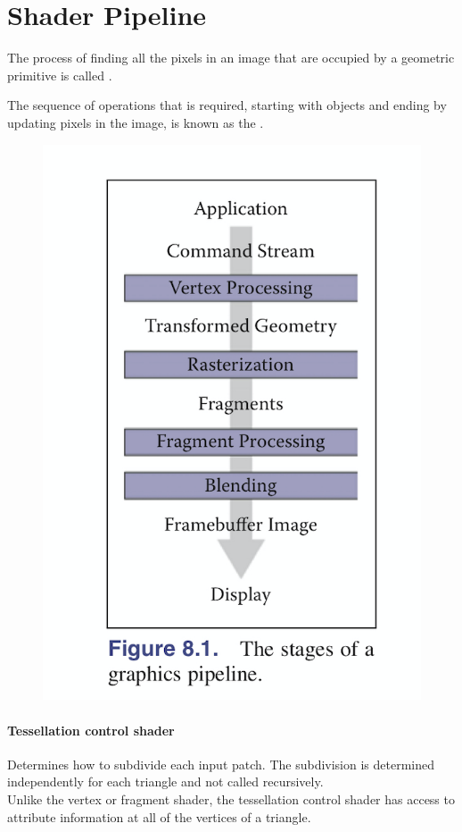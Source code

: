 \documentclass[11pt]{article}
\numberwithin{equation}{section}
\begin{document}
\section{Shader Pipeline}
The process of finding all the pixels in an image that are occupied by a geometric primitive is called .

The sequence of operations that is required, starting with objects and ending by updating pixels in the image, is known as the .
\begin{figure}[H]
	\centering
	\includegraphics[scale=0.5]{p37}
\end{figure}
\paragraph{Tessellation control shader}
Determines how to subdivide each input patch. The subdivision is determined independently for each triangle and not called recursively.\\
Unlike the vertex or fragment shader, the tessellation control shader has access to attribute information at all of the vertices of a triangle.
\end{document}
